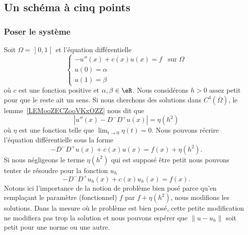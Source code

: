\subsection{Un schéma à cinq points}

\subsubsection{Poser le système}

Soit \( \Omega=\mathopen] 0 , 1 \mathclose[\) et l'équation différentielle
	\begin{equation}        \label{EQooXJBWooRhCsLy}
		\begin{cases}
			-u''(x)+c(x)u(x)=f & \text{sur } \Omega \\
			u(0)=\alpha                             \\
			u(1)=\beta
		\end{cases}
	\end{equation}
	où \( c\) est une fonction positive et \( \alpha,\beta\in \eR\). Nous considérons \( h>0\) assez petit pour que le reste ait un sens. Si nous cherchons des solutions dans \( C^4(\overline{ \Omega })\), le lemme~\ref{LEMooZECZooVKxOZZ} nous dit que
	\begin{equation}
		| u''(x)-D^-D^+u(x) |=\eta(h^2)
	\end{equation}
	où \( \eta\) est une fonction telle que \( \lim_{t\to 0} \eta(t)=0\). Nous pouvons récrire l'équation différentielle sous la forme
	\begin{equation}
		-D^-D^+u(x)+c(x)u(x)=f(x)+\eta(h^2).
	\end{equation}
	Si nous négligeons le terme \( \eta(h^2)\) qui est supposé être petit nous pouvons tenter de résoudre pour la fonction \( u_h\)
	\begin{equation}
		-D^-D^+u_h(x)+c(x)u_h(x)=f(x).
	\end{equation}
	Notons ici l'importance de la notion de problème bien posé parce qu'en remplaçant le paramètre (fonctionnel) \( f\) par \( f+\eta(h^2)\), nous modifions les solutions. Dans la mesure où le problème est bien posé, cette petite modification ne modifiera pas trop la solution et nous pouvons espérer que \( \| u-u_h \|\) soit petit pour une norme ou une autre.

